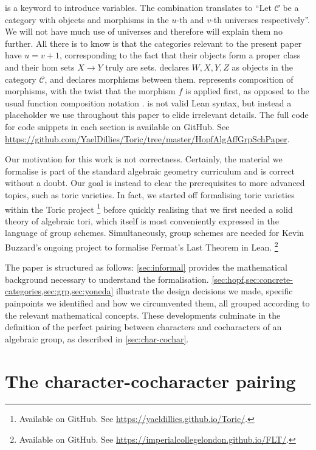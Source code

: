 \documentclass{article}
\newcommand{\mcC}{\mathcal C}
\begin{document}
 is a keyword to introduce variables.
The combination  translates to ``Let $\mcC$ be a category with objects and morphisms in the $u$-th and $v$-th universes respectively''.
We will not have much use of universes and therefore will explain them no further.
All there is to know is that the categories relevant to the present paper have $u = v + 1$, corresponding to the fact that their objects form a proper class and their hom sets $X \to Y$ truly are sets.
 declares $W, X, Y, Z$ as objects in the category $\mcC$, and  declares morphisms between them.
 represents composition of morphisms, with the twist that the morphism $f$ is applied first, as opposed to the usual function composition notation .
 is not valid Lean syntax, but instead a placeholder we use throughout this paper to elide irrelevant details.
The full code for code snippets in each section is available on GitHub. See \url{https://github.com/YaelDillies/Toric/tree/master/HopfAlgAffGrpSchPaper}.

Our motivation for this work is not correctness.
Certainly, the material we formalise is part of the standard algebraic geometry curriculum and is correct without a doubt.
Our goal is instead to clear the prerequisites to more advanced topics, such as toric varieties.
In fact, we started off formalising toric varieties within the Toric project
\footnote{Available on GitHub. See \url{https://yaeldillies.github.io/Toric/}.}
before quickly realising that we first needed a solid theory of algebraic tori, which itself is most conveniently expressed in the language of group schemes.
Simultaneously, group schemes are needed for Kevin Buzzard's ongoing project to formalise Fermat's Last Theorem in Lean.
\footnote{Available on GitHub. See \url{https://imperialcollegelondon.github.io/FLT/}.}

The paper is structured as follows:
\cref{sec:informal} provides the mathematical background necessary to understand the formalisation.
\cref{sec:hopf,sec:concrete-categories,sec:grp,sec:yoneda} illustrate the design decisions we made, specific painpoints we identified and how we circumvented them, all grouped according to the relevant mathematical concepts.
These developments culminate in the definition of the perfect pairing between characters and cocharacters of an algebraic group, as described in \cref{sec:char-cochar}.


\section{The character-cocharacter pairing}
\end{document}
